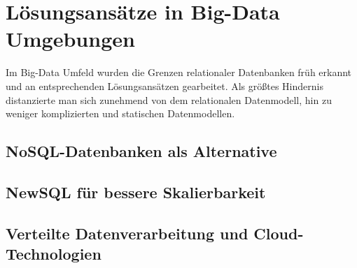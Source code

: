 \section{Lösungsansätze in Big-Data Umgebungen}

Im Big-Data Umfeld wurden die Grenzen relationaler Datenbanken früh erkannt und an entsprechenden Lösungsansätzen gearbeitet. Als größtes Hindernis distanzierte man sich zunehmend von dem relationalen Datenmodell, hin zu weniger komplizierten und statischen Datenmodellen.

\subsection{NoSQL-Datenbanken als Alternative}



\subsection{NewSQL für bessere Skalierbarkeit}

\subsection{Verteilte Datenverarbeitung und Cloud-Technologien}
